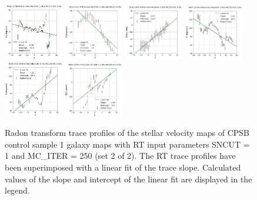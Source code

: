\documentclass[fleqn,usenatbib]{mnras}
\begin{document}
\begin{figure}
    \includegraphics[width=0.23\textwidth]{Images/LINFITS/CC1-9182-12703-LINFIT-EBARS-MASKED.png}
    \includegraphics[width=0.23\textwidth]{Images/LINFITS/CC1-9184-1901-LINFIT-EBARS-MASKED.png}
    \includegraphics[width=0.23\textwidth]{Images/LINFITS/CC1-9195-1901-LINFIT-EBARS-MASKED.png}
    \includegraphics[width=0.23\textwidth]{Images/LINFITS/CC1-9497-12704-LINFIT-EBARS-MASKED.png}
    \includegraphics[width=0.23\textwidth]{Images/LINFITS/CC1-9508-3701-LINFIT-EBARS-MASKED.png}
    \includegraphics[width=0.23\textwidth]{Images/LINFITS/CC1-9869-12701-LINFIT-EBARS-MASKED.png}
    \caption{Radon transform trace profiles of the stellar velocity maps of CPSB control sample 1 galaxy maps with RT input parameters SNCUT = 1 and MC\_ITER = 250 (set 2 of 2). The RT trace profiles have been superimposed with a linear fit of the trace slope. Calculated values of the slope and intercept of the linear fit are displayed in the legend.}
    \label{fig:Radon-traces-CC1-LINFITS-2}
\end{figure}
\end{document}
